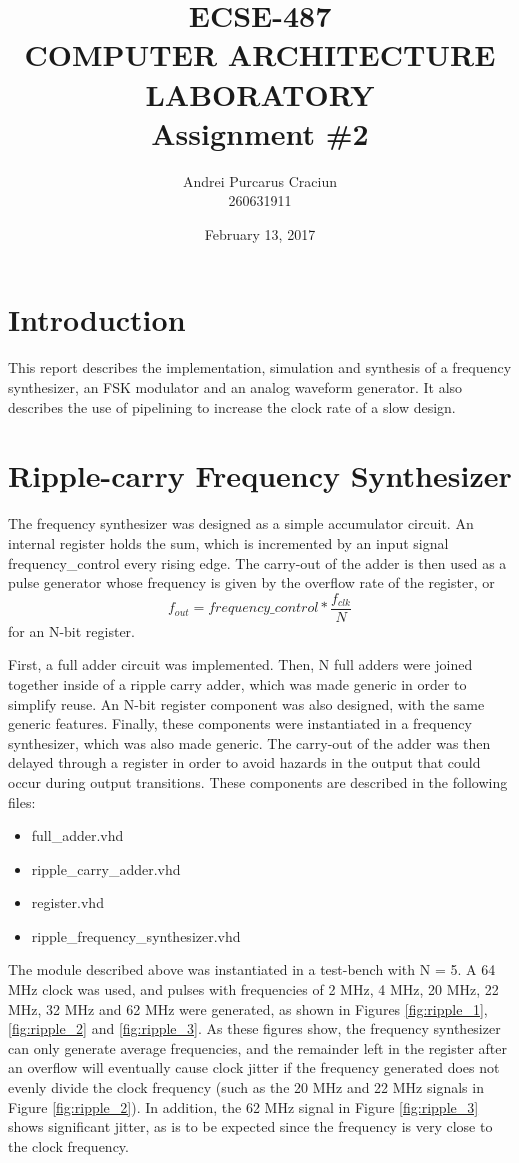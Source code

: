 \documentclass[a4paper, 10pt, titlepage]{article}
\title{\textbf{ECSE-487 \\ COMPUTER ARCHITECTURE LABORATORY \\ Assignment \#2}}
\author{Andrei Purcarus Craciun \\ 260631911}
\date{February 13, 2017}
\begin{document}
\maketitle

\section{Introduction}

This report describes the implementation, simulation and synthesis of a frequency synthesizer, an FSK modulator and an analog waveform generator. It also describes the use of pipelining to increase the clock rate of a slow design.

\section{Ripple-carry Frequency Synthesizer}

The frequency synthesizer was designed as a simple accumulator circuit. An internal register holds the sum, which is incremented by an input signal frequency\_control every rising edge. The carry-out of the adder is then used as a pulse generator whose frequency is given by the overflow rate of the register, or
\[ f_{out} = frequency\_control * \frac{f_{clk}}{N} \]
for an N-bit register.

First, a full adder circuit was implemented. Then, N full adders were joined together inside of a ripple carry adder, which was made generic in order to simplify reuse. An N-bit register component was also designed, with the same generic features. Finally, these components were instantiated in a frequency synthesizer, which was also made generic. The carry-out of the adder was then delayed through a register in order to avoid hazards in the output that could occur during output transitions. These components are described in the following files:
\begin{itemize}
    \item full\_adder.vhd
    \item ripple\_carry\_adder.vhd
    \item register.vhd
    \item ripple\_frequency\_synthesizer.vhd
\end{itemize}

The module described above was instantiated in a test-bench with N = 5. A 64 MHz clock was used, and pulses with frequencies of 2 MHz, 4 MHz, 20 MHz, 22 MHz, 32 MHz and 62 MHz were generated, as shown in Figures \ref{fig:ripple_1}, \ref{fig:ripple_2} and \ref{fig:ripple_3}. As these figures show, the frequency synthesizer can only generate average frequencies, and the remainder left in the register after an overflow will eventually cause clock jitter if the frequency generated does not evenly divide the clock frequency (such as the 20 MHz and 22 MHz signals in Figure \ref{fig:ripple_2}). In addition, the 62 MHz signal in Figure \ref{fig:ripple_3} shows significant jitter, as is to be expected since the frequency is very close to the clock frequency.
\end{document}
